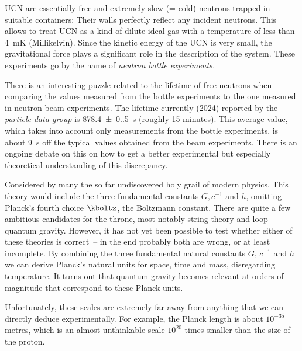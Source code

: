 \documentclass{scrartcl}
\begin{document}
UCN are essentially free and extremely slow (= cold) neutrons trapped in suitable containers: Their walls perfectly reflect any incident neutrons. This allows to treat UCN as a kind of dilute ideal gas with a temperature of less than \qty{4}{\milli\kelvin} (Millikelvin). Since the kinetic energy of the UCN is very small, the gravitational force plays a significant role in the description of the system. These experiments go by the name of \emph{neutron bottle experiments.}

There is an interesting puzzle related to the lifetime of free neutrons when comparing the values measured from the bottle experiments to the one measured in neutron beam experiments. The lifetime currently (2024) reported by the \emph{particle data group} is \qty{878.4(0.5)}{\second} (roughly 15 minutes). This average value, which takes into account only measurements from the bottle experiments, is about \qty{9}{\second} off the typical values obtained from the beam experiments. There is an ongoing debate on this on how to get a better experimental but especially theoretical understanding of this discrepancy.



\newpage {}
\label{sec:1110}

Considered by many the so far undiscovered holy grail of modern physics. This theory would include the three fundamental constants $G,c^{−1}$ and $h$, omitting Planck's fourth choice $\kboltz$, the Boltzmann constant. There are quite a few ambitious candidates for the throne, most notably string theory and loop quantum gravity. However, it has not yet been possible to test whether either of these theories is correct~-- in the end probably both are wrong, or at least incomplete. By combining the three fundamental natural constants $G$, $c^{-1}$ and $h$ we can derive Planck's natural units for space, time and mass, disregarding temperature. It turns out that quantum gravity becomes relevant at orders of magnitude that correspond to these Planck units.

Unfortunately, these scales are extremely far away from anything that we can directly deduce experimentally. For example, the Planck length is about $10^{−35}$ metres, which is an almost unthinkable scale $10^{20}$ times smaller than the size of the proton.
\end{document}
